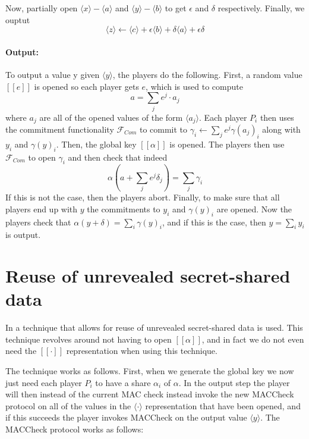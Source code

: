 \documentclass[../main.tex]{subfiles}
\begin{document}
Now, partially open $\langle x \rangle - \langle a \rangle$ and $\langle y \rangle - \langle b \rangle$ to get $\epsilon$ and $\delta$ respectively. Finally, we ouptut $$\langle z \rangle \leftarrow \langle c \rangle + \epsilon \langle b \rangle + \delta \langle a \rangle + \epsilon \delta$$

\paragraph{Output:}
To output a value y given $\langle y \rangle$, the players do the following.
First, a random value $[\![ e ]\!]$ is opened so each player gets $e$, which is used to compute $$a = \sum_j e^j \cdot a_j$$ where $a_j$ are all of the opened values of the form $\langle a_j \rangle$.
Each player $P_i$ then uses the commitment functionality $\mathcal{F}_{Com}$ to commit to $\gamma_i \leftarrow \sum_j e^j \gamma(a_j)_i$ along with $y_i$ and $\gamma(y)_i$.
Then, the global key $[\![ \alpha ]\!]$ is opened.
The players then use $\mathcal{F}_{Com}$ to open $\gamma_i$ and then check that indeed $$\alpha(a + \sum_j e^j \delta_j) = \sum_j \gamma_i$$
If this is not the case, then the players abort.
Finally, to make sure that all players end up with $y$ the commitments to $y_i$ and $\gamma(y)_i$ are opened. Now the players check that $\alpha(y + \delta) = \sum_i \gamma(y)_i$, and if this is the case, then $y = \sum_i y_i$ is output.



\section{Reuse of unrevealed secret-shared data} \label{section: Reuse}
In \cite{damgaard2013practical} a technique that allows for reuse of unrevealed secret-shared data is used.
This technique revolves around not having to open $[\![ \alpha ]\!]$, and in fact we do not even need the $[\![ \cdot ]\!]$ representation when using this technique.

The technique works as follows.
First, when we generate the global key we now just need each player $P_i$ to have a share $\alpha_i$ of $\alpha$. In the output step the player will then instead of the current MAC check instead invoke the new MACCheck protocol on all of the values in the $\langle \cdot \rangle$ representation that have been opened, and if this succeeds the player invokes MACCheck on the output value $\langle y \rangle$. The MACCheck protocol works as follows:
\end{document}
